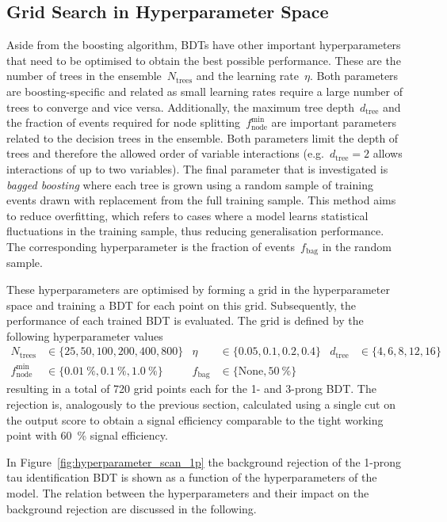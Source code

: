 \subsection{Grid Search in Hyperparameter Space}
\label{sec:bdt_grid_search}

Aside from the boosting algorithm, BDTs have other important hyperparameters
that need to be optimised to obtain the best possible performance. These are the
number of trees in the ensemble~$N_\text{trees}$ and the learning rate~$\eta$.
Both parameters are boosting-specific and related as small learning rates
require a large number of trees to converge and vice versa. Additionally, the
maximum tree depth~$d_\text{tree}$ and the fraction of events required for node
splitting~$f_\text{node}^\text{min}$ are important parameters related to the
decision trees in the ensemble. Both parameters limit the depth of trees and
therefore the allowed order of variable interactions (e.g.\ $d_\text{tree} = 2$
allows interactions of up to two variables). The final parameter that is
investigated is \emph{bagged boosting} where each tree is grown using a random
sample of training events drawn with replacement from the full training sample.
This method aims to reduce overfitting, which refers to cases where a model
learns statistical fluctuations in the training sample, thus reducing
generalisation performance. The corresponding hyperparameter is the fraction of
events~$f_\text{bag}$ in the random sample.

These hyperparameters are optimised by forming a grid in the hyperparameter
space and training a BDT for each point on this grid. Subsequently, the
performance of each trained BDT is evaluated. The grid is defined by the
following hyperparameter values
\begin{align*}
  N_\mathrm{trees} &\in \{25, 50, 100, 200, 400, 800\} & \eta &\in \{0.05, 0.1, 0.2, 0.4\} & d_\mathrm{tree} &\in \{4, 6, 8, 12, 16\}\\
  f_\mathrm{node}^\mathrm{min} &\in \{\SI{0.01}{\percent}, \SI{0.1}{\percent},\SI{1.0}{\percent}\} & f_\text{bag} &\in \{\text{None}, \SI{50}{\percent} \}
\end{align*}
resulting in a total of 720 grid points each for the 1- and 3-prong BDT. The
rejection is, analogously to the previous section, calculated using a single cut
on the output score to obtain a signal efficiency comparable to the tight
working point with \SI{60}{\percent} signal efficiency.

In Figure~\ref{fig:hyperparameter_scan_1p} the background rejection of the
1-prong tau identification BDT is shown as a function of the hyperparameters of
the model. The relation between the hyperparameters and their impact on the
background rejection are discussed in the following.

